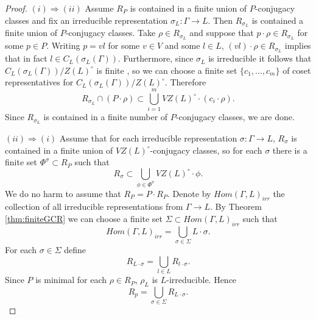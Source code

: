 \begin{proof}\quad

  $(i) \Rightarrow (ii)$ Assume $R_P$ is contained in a finite union of $P$-conjugacy classes and fix an irreducible representation $\sigma_L : \Gamma \rightarrow L$. Then $R_{\sigma_L}$ is contained a finite union of $P$-conjugacy classes. Take $\rho \in R_{\sigma_L}$ and suppose that $p \cdot \rho \in R_{\sigma_L}$ for some $p \in P$. Writing $p = vl$ for some $v \in V$ and some $l \in L$, $(vl) \cdot \rho \in R_{\sigma_L}$ implies that in fact $l \in C_L(\sigma_L(\Gamma))$. Furthermore, since $\sigma_L$ is irreducible it follows that $C_L(\sigma_L(\Gamma))/Z(L)^\circ$ is finite \cite[Lemma 6.2]{martin2003reductive}, so we can choose a finite set $\{c_1, \ldots, c_m\}$ of coset representatives for $C_L(\sigma_L(\Gamma))/Z(L)^\circ$. Therefore
  \begin{displaymath}
    R_{\sigma_L} \cap (P \cdot \rho) \subset \bigcup_{i = 1}^{m} VZ(L)^\circ \cdot \left( c_i \cdot \rho \right).
  \end{displaymath}
  Since $R_{\sigma_L}$ is contained in a finite number of $P$-conjugacy classes, we are done.

  $(ii) \Rightarrow (i)$ Assume that for each irreducible representation $\sigma : \Gamma \rightarrow L$, $R_{\sigma}$ is contained in a finite union of $VZ(L)^\circ$-conjugacy classes, so for each $\sigma$ there is a finite set $\Phi^\sigma \subset R_P$ such that
  \begin{displaymath}
    R_\sigma \subset \bigcup_{\phi \in \Phi^\sigma} VZ(L)^\circ \cdot \phi.
  \end{displaymath}
  We do no harm to assume that $R_P = P \cdot R_P$. Denote by $Hom(\Gamma, L)_{irr}$ the collection of all irreducible representations from $\Gamma \rightarrow L$. By Theorem \ref{thm:finiteGCR} we can choose a finite set $\Sigma \subset Hom(\Gamma, L)_{irr}$ such that
  \begin{displaymath}
    Hom(\Gamma, L)_{irr} = \bigcup_{\sigma \in \Sigma} L \cdot \sigma.
  \end{displaymath}
  For each $\sigma \in \Sigma$ define 
  \begin{displaymath}
    R_{L \cdot \sigma} = \bigcup_{l \in L} R_{l \cdot \sigma}.
  \end{displaymath}
  Since $P$ is minimal for each $\rho \in R_P$, $\rho_L$ is $L$-irreducible. Hence
  \begin{displaymath}
    R_p = \bigcup_{\sigma \in \Sigma} R_{L \cdot \sigma}.
  \end{displaymath}


\end{proof}
